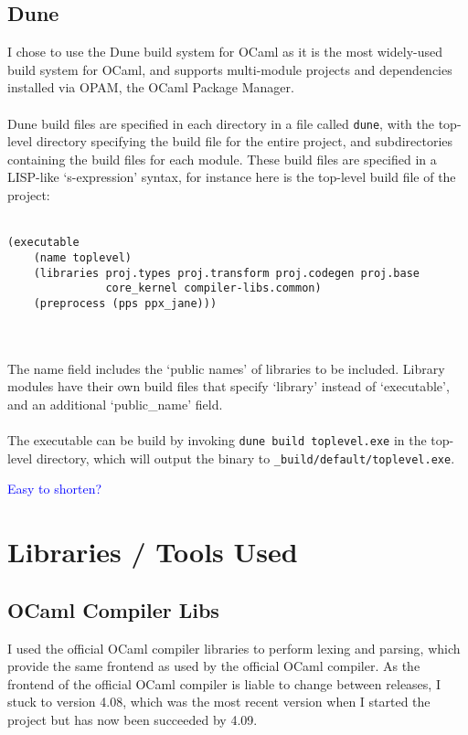 \documentclass[12pt,twoside,notitlepage]{report}
\newcommand{\textinline}{\texttt}
\newcommand\note[1]{\textcolor{blue}{#1}}
\begin{document}
\subsection{Dune}
I chose to use the Dune\cite{Dune} build system for OCaml as it is the most widely-used build system for OCaml, and supports multi-module projects and dependencies installed via OPAM, the OCaml Package Manager.
\\\\
Dune build files are specified in each directory in a file called \textinline{dune}, with the top-level directory specifying the build file for the entire project, and subdirectories containing the build files for each module. These build files are specified in a LISP-like `s-expression' syntax, for instance here is the top-level build file of the project:
\\\\
\begin{minipage}{\linewidth}

\begin{verbatim}
(executable
    (name toplevel)
    (libraries proj.types proj.transform proj.codegen proj.base
               core_kernel compiler-libs.common)
    (preprocess (pps ppx_jane)))
\end{verbatim}
\end{minipage}
\\\\
The name field includes the `public names' of libraries to be included. Library modules have their own build files that specify `library' instead of `executable', and an additional `public\_name' field.
\\\\
The executable can be build by invoking \textinline{dune build toplevel.exe} in the top-level directory, which will output the binary to \textinline{_build/default/toplevel.exe}.

\note{Easy to shorten?}

\section{Libraries / Tools Used}
\subsection{OCaml Compiler Libs}
I used the official OCaml compiler \cite{OCaml} libraries to perform lexing and parsing, which provide the same frontend as used by the official OCaml compiler. As the frontend of the official OCaml compiler is liable to change between releases, I stuck to version 4.08, which was the most recent version when I started the project but has now been succeeded by 4.09.
\end{document}
